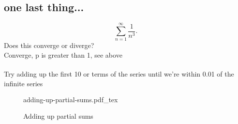 \documentclass[12pt]{article}
\newcommand{\incfig}[1]{%
    \def\svgwidth{\columnwidth}
    {#1.pdf_tex}
}
\begin{document}
\subsection*{one last thing...}
\[
\sum_{n=1}^{\infty} \frac{1}{n^{3}} 
.\] 
Does this converge or diverge? \\ Converge, p is greater than 1, see above
\\
\\
Try adding up the first 10 or terms of the series until we're within 0.01 of the infinite series 


\begin{figure}[ht]
    \centering
    \incfig{adding-up-partial-sums}
    \caption{Adding up partial sums}
    \label{fig:adding-up-partial-sums}
\end{figure}
\end{document}

